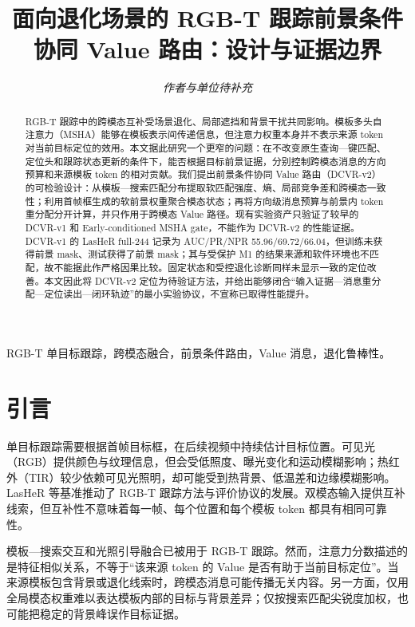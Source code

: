 \documentclass[journal]{IEEEtran}
\begin{document}
\title{面向退化场景的 RGB-T 跟踪前景条件协同 Value 路由：设计与证据边界}
\author{\textit{作者与单位待补充}}
\maketitle

\begin{abstract}
RGB-T 跟踪中的跨模态互补受场景退化、局部遮挡和背景干扰共同影响。模板多头自注意力（MSHA）能够在模板表示间传递信息，但注意力权重本身并不表示来源 token 对当前目标定位的效用。本文据此研究一个更窄的问题：在不改变原生查询—键匹配、定位头和跟踪状态更新的条件下，能否根据目标前景证据，分别控制跨模态消息的方向预算和来源模板 token 的相对贡献。我们提出前景条件协同 Value 路由（DCVR-v2）的可检验设计：从模板—搜索匹配分布提取软匹配强度、熵、局部竞争差和跨模态一致性；利用首帧框生成的软前景权重聚合模态状态；再将方向级消息预算与前景内 token 重分配分开计算，并只作用于跨模态 Value 路径。现有实验资产只验证了较早的 DCVR-v1 和 Early-conditioned MSHA gate，不能作为 DCVR-v2 的性能证据。DCVR-v1 的 LasHeR full-244 记录为 AUC/PR/NPR 55.96/69.72/66.04，但训练未获得前景 mask、测试获得了前景 mask；其与受保护 M1 的结果来源和软件环境也不匹配，故不能据此作严格因果比较。固定状态和受控退化诊断同样未显示一致的定位改善。本文因此将 DCVR-v2 定位为待验证方法，并给出能够闭合“输入证据—消息重分配—定位读出—闭环轨迹”的最小实验协议，不宣称已取得性能提升。
\end{abstract}

\begin{IEEEkeywords}
RGB-T 单目标跟踪，跨模态融合，前景条件路由，Value 消息，退化鲁棒性。
\end{IEEEkeywords}

\section{引言}
单目标跟踪需要根据首帧目标框，在后续视频中持续估计目标位置。可见光（RGB）提供颜色与纹理信息，但会受低照度、曝光变化和运动模糊影响；热红外（TIR）较少依赖可见光照明，却可能受到热背景、低温差和边缘模糊影响。LasHeR 等基准推动了 RGB-T 跟踪方法与评价协议的发展\cite{li2019benchmark,li2022lasher}。双模态输入提供互补线索，但互补性不意味着每一帧、每个位置和每个模板 token 都具有相同可靠性。

模板—搜索交互和光照引导融合已被用于 RGB-T 跟踪\cite{hui2023tbsi,li2025tbsi}。然而，注意力分数描述的是特征相似关系，不等于“该来源 token 的 Value 是否有助于当前目标定位”。当来源模板包含背景或退化线索时，跨模态消息可能传播无关内容。另一方面，仅用全局模态权重难以表达模板内部的目标与背景差异；仅按搜索匹配尖锐度加权，也可能把稳定的背景峰误作目标证据。
\end{document}
